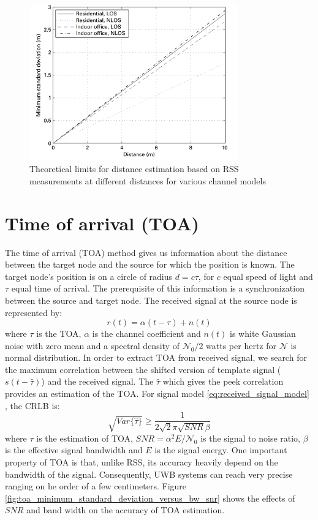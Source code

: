 \documentclass[\main/main.tex]{subfiles}
\begin{document}
\begin{figure}[htbp]
    \centering
    \includegraphics[width=0.8\textwidth]{limits_for_distance_estimation_based_on_rss_measurements}
    \caption{Theoretical limits for distance estimation based on RSS measurements at different distances for various channel models}
    \label{fig:limits_for_distance_estimation_based_on_rss_measurements}
\end{figure}

\section{Time of arrival (TOA)}

The time of arrival (TOA) method gives us information about the distance between the target node and the source for which the position is known. The target node's position is on a circle of radius $d=c\tau$, for $c$ equal speed of light and $\tau$ equal time of arrival. The prerequisite of this information is a synchronization between the source and target node. The received signal at the source node is represented by:
\begin{equation}
    r(t) = \alpha(t-\tau) + n(t)
\end{equation}
where $\tau$ is the TOA, $\alpha$ is the channel coefficient and $n(t)$ is white Gaussian noise with zero mean and a spectral density of $\mathcal{N}_0/2$ watts per hertz for $\mathcal{N}$ is normal distribution. In order to extract TOA from received signal, we search for the maximum correlation between the shifted version of template signal ($s(t-\hat{\tau})$) and the received signal. The $\hat{\tau}$ which gives the peek correlation provides an estimation of the TOA. For signal model \ref{eq:received_signal_model} , the CRLB is:
\begin{equation}
    \sqrt{Var\{\hat{\tau}\}} \geq \frac{1}{2\sqrt{2}\pi\sqrt{SNR}\beta}
\end{equation}
where $\tau$ is the estimation of TOA, $SNR = \alpha^2 E / \mathcal{N}_0$ is the signal to noise ratio, $\beta$ is the effective signal bandwidth and $E$ is the signal energy. One important property of TOA is that, unlike RSS, its accuracy heavily depend on the bandwidth of the signal. Consequently, UWB systems can reach very precise ranging on he order of a few centimeters. Figure \ref{fig:toa_minimum_standard_deviation_versus_bw_snr} shows the effects of $SNR$ and band width on the accuracy of TOA estimation.
\end{document}
